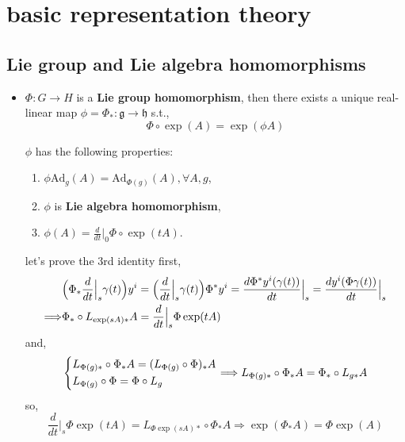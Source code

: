 \chapter{basic representation theory}
\section{Lie group and Lie algebra homomorphisms}
\begin{itemize}
	\item $\Phi : G \rightarrow H$ is a \textbf{Lie group homomorphism}, then there exists a unique real-linear map $\phi = \Phi_* : \mathfrak{g} \rightarrow \mathfrak{h}$ s.t.,
	\begin{equation}
		\Phi \circ \exp(A) = \exp(\phi A)
	\end{equation}
	
	$\phi$ has the following properties:
	\begin{enumerate}
		\item $\phi \mathrm{Ad}_g(A) = \mathrm{Ad}_{\Phi(g)}(A), \forall A, g$,
		
		\item $\phi$ is \textbf{Lie algebra homomorphism},
		
		\item $\phi(A) = \frac{d}{dt} \big|_0 \Phi \circ \exp(t A)$.
	\end{enumerate}
	
	\begin{tcolorbox}[title=proof:]
		let's prove the 3rd identity first,
		\begin{align}
			& \Big( \Phi_* \frac{d}{dt} \Big|_s \gamma(t) \Big) y^i = \Big( \frac{d}{dt} \Big|_s \gamma(t) \Big) \Phi^* y^i = \frac{d \Phi^* y^i(\gamma(t))}{dt} \Big|_s = \frac{d y^i(\Phi \gamma(t))}{dt} \Big|_s \notag \\
			\Longrightarrow & \Phi_* \circ L_{\exp(s A) *} A = \frac{d}{dt} \Big|_s \Phi \exp(t A)
		\end{align}
		and,
		\begin{equation}
			\begin{dcases}
				L_{\Phi(g) *} \circ \Phi_* A = (L_{\Phi(g)} \circ \Phi)_* A \\
				L_{\Phi(g)} \circ \Phi = \Phi \circ L_g
			\end{dcases} \Longrightarrow L_{\Phi(g) *} \circ \Phi_* A = \Phi_* \circ L_{g *} A
		\end{equation}
		so,
		\begin{equation}
			\frac{d}{dt} \Big|_s \Phi \exp(t A) = L_{\Phi \exp(s A) *} \circ \Phi_* A \Longrightarrow \exp(\Phi_* A) = \Phi \exp(A)
		\end{equation}
		

\end{tcolorbox}
\end{itemize}
